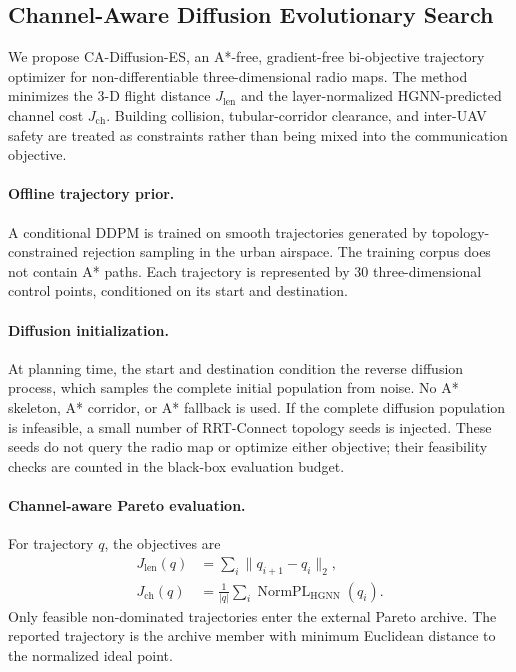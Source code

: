 \subsection{Channel-Aware Diffusion Evolutionary Search}
\label{sec:cades}

We propose CA-Diffusion-ES, an A*-free, gradient-free bi-objective trajectory optimizer for
non-differentiable three-dimensional radio maps. The method minimizes the 3-D flight distance
$J_{\mathrm{len}}$ and the layer-normalized HGNN-predicted channel cost $J_{\mathrm{ch}}$.
Building collision, tubular-corridor clearance, and inter-UAV safety are treated as constraints
rather than being mixed into the communication objective.

\paragraph{Offline trajectory prior.}
A conditional DDPM is trained on smooth trajectories generated by topology-constrained rejection
sampling in the urban airspace. The training corpus does not contain A* paths. Each trajectory is
represented by 30 three-dimensional control points, conditioned on its start and destination.

\paragraph{Diffusion initialization.}
At planning time, the start and destination condition the reverse diffusion process, which samples
the complete initial population from noise. No A* skeleton, A* corridor, or A* fallback is used.
If the complete diffusion population is infeasible, a small number of RRT-Connect topology seeds
is injected. These seeds do not query the radio map or optimize either objective; their feasibility
checks are counted in the black-box evaluation budget.

\paragraph{Channel-aware Pareto evaluation.}
For trajectory $q$, the objectives are
\begin{align}
J_{\mathrm{len}}(q) &= \sum_i \|q_{i+1}-q_i\|_2,\\
J_{\mathrm{ch}}(q) &= \frac{1}{|q|}\sum_i
\operatorname{NormPL}_{\mathrm{HGNN}}(q_i).
\end{align}
Only feasible non-dominated trajectories enter the external Pareto archive. The reported trajectory
is the archive member with minimum Euclidean distance to the normalized ideal point.

